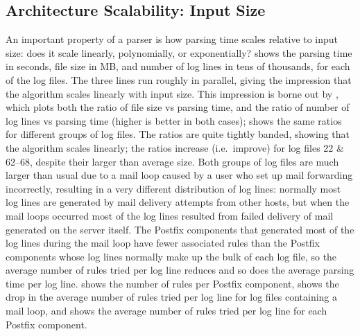 \subsection{Architecture Scalability: Input Size}

An important property of a parser is how parsing time scales relative to
input size: does it scale linearly, polynomially, or exponentially?
 shows the
parsing time in seconds, file size in MB, and number of log lines in tens
of thousands, for each of the \numberOFlogFILES{} log files.  The three
lines run roughly in parallel, giving the impression that the algorithm
scales linearly with input size.  This impression is borne out by
, which
plots both the ratio of file size vs parsing time, and the ratio of number
of log lines vs parsing time (higher is better in both cases);
shows the same ratios for different groups of log files.  The ratios are
quite tightly banded, showing that the algorithm scales linearly; the
ratios increase (i.e.\ improve) for log files 22 \& 62--68, despite their
larger than average size.  Both groups of log files are much larger than
usual due to a mail loop caused by a user who set up mail forwarding
incorrectly, resulting in a very different distribution of log lines:
normally most log lines are generated by mail delivery attempts from other
hosts, but when the mail loops occurred most of the log lines resulted from
failed delivery of mail generated on the server itself.  The Postfix
components that generated most of the log lines during the mail loop have
fewer associated rules than the Postfix components whose log lines normally
make up the bulk of each log file, so the average number of rules tried per
log line reduces and so does the average parsing time per log line.
 shows the number of rules
per Postfix component,  shows the drop in the average number of rules tried per log line for
log files containing a mail loop, and  shows the average number of
rules tried per log line for each Postfix component.


